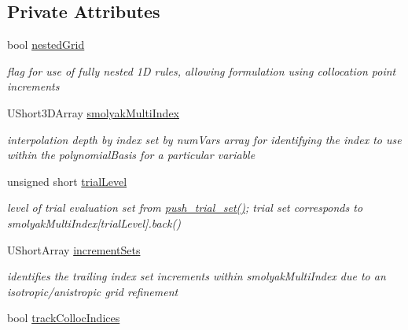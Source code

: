 \subsection*{Private Attributes}
\begin{DoxyCompactItemize}
\item 
bool \hyperlink{classPecos_1_1HierarchSparseGridDriver_a89ccad2f5ea68ce90e10140ba64cbd2b}{nested\+Grid}\label{classPecos_1_1HierarchSparseGridDriver_a89ccad2f5ea68ce90e10140ba64cbd2b}

\begin{DoxyCompactList}\small\item\em flag for use of fully nested 1D rules, allowing formulation using collocation point increments \end{DoxyCompactList}\item 
U\+Short3\+D\+Array \hyperlink{classPecos_1_1HierarchSparseGridDriver_a1899fc99ce06e7d1dab0c21445725cba}{smolyak\+Multi\+Index}
\begin{DoxyCompactList}\small\item\em interpolation depth by index set by num\+Vars array for identifying the index to use within the polynomial\+Basis for a particular variable \end{DoxyCompactList}\item 
unsigned short \hyperlink{classPecos_1_1HierarchSparseGridDriver_a69e006a77c0dcbba4d6784d0678a137c}{trial\+Level}\label{classPecos_1_1HierarchSparseGridDriver_a69e006a77c0dcbba4d6784d0678a137c}

\begin{DoxyCompactList}\small\item\em level of trial evaluation set from \hyperlink{classPecos_1_1HierarchSparseGridDriver_a99c17efb3a8e873b7708652cc1787370}{push\+\_\+trial\+\_\+set()}; trial set corresponds to smolyak\+Multi\+Index\mbox{[}trial\+Level\mbox{]}.back() \end{DoxyCompactList}\item 
U\+Short\+Array \hyperlink{classPecos_1_1HierarchSparseGridDriver_a36e2466de81a49ee32105f49eda11573}{increment\+Sets}\label{classPecos_1_1HierarchSparseGridDriver_a36e2466de81a49ee32105f49eda11573}

\begin{DoxyCompactList}\small\item\em identifies the trailing index set increments within smolyak\+Multi\+Index due to an isotropic/anistropic grid refinement \end{DoxyCompactList}\item 
bool \hyperlink{classPecos_1_1HierarchSparseGridDriver_a277523d2de6de32b78ab32f0e4d24e9f}{track\+Colloc\+Indices}\label{classPecos_1_1HierarchSparseGridDriver_a277523d2de6de32b78ab32f0e4d24e9f}


\end{DoxyCompactItemize}
